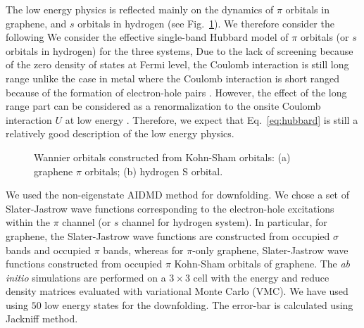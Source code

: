 The low energy physics is reflected mainly on the dynamics of $\pi$ orbitals in graphene, and $s$ orbitals in hydrogen (see Fig.~\ref{fig:honeycomb_wan}). We therefore consider the following We consider the effective single-band Hubbard model of $\pi$ orbitals (or $s$ orbitals in hydrogen) for the three systems, 
Due to the lack of screening because of the zero density of states at Fermi level, the Coulomb interaction is still long range unlike the case in metal where the Coulomb interaction is short ranged because of the formation of electron-hole pairs \cite{Zheng2016}. 
However, the effect of the long range part can be considered as a renormalization to the onsite Coulomb interaction $U$ at low energy \cite{Schuler2013, Changlani2015}. 
Therefore, we expect that Eq.~\eqref{eq:hubbard} is still a relatively good description of the low energy physics. 
\begin{figure}[hbt]
  \centering  
       \caption{Wannier orbitals constructed from Kohn-Sham orbitals: (a) graphene $\pi$ orbitals; (b) hydrogen S orbital. }
\label{fig:honeycomb_wan}
\end{figure}

We used the non-eigenstate AIDMD method for downfolding. We chose a set of Slater-Jastrow wave functions corresponding to the electron-hole excitations within the $\pi$ channel (or $s$ channel for hydrogen system). In particular, for graphene, the Slater-Jastrow wave functions are constructed from occupied $\sigma$ bands and occupied $\pi$ bands, whereas for $\pi$-only graphene, Slater-Jastrow wave functions constructed from occupied $\pi$ Kohn-Sham orbitals of graphene. The \textit{ab initio} simulations are performed on a $3\times3$ cell with the energy and reduce density matrices evaluated with variational Monte Carlo (VMC). We have used using $50$ low energy states for the downfolding. The error-bar is calculated using Jackniff method. 

